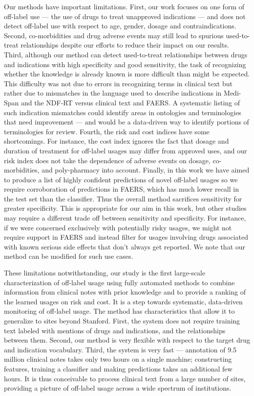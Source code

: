 Our methods have important limitations.  First, our work focuses on
one form of off-label use — the use of drugs to treat unapproved
indications — and does not detect off-label use with respect to age,
gender, dosage and contraindications.  Second, co-morbidities and drug
adverse events may still lead to spurious used-to-treat relationships
despite our efforts to reduce their impact on our results. Third,
although our method can detect used-to-treat relationships between
drugs and indications with high specificity and good sensitivity, the
task of recognizing whether the knowledge is already known is more
difficult than might be expected.  This difficulty was not due to
errors in recognizing terms in clinical text but rather due to
mismatches in the language used to describe indications in Medi-Span
and the NDF-RT versus clinical text and FAERS.  A systematic listing
of such indication mismatches could identify areas in ontologies and
terminologies that need improvement — and would be a data-driven way
to identify portions of terminologies for review.  Fourth, the risk
and cost indices have some shortcomings.  For instance, the cost index
ignores the fact that dosage and duration of treatment for off-label
usages may differ from approved uses, and our risk index does not take
the dependence of adverse events on dosage, co-morbidities, and
poly-pharmacy into account.  Finally, in this work we have aimed to
produce a list of highly confident predictions of novel off-label
usages so we require corroboration of predictions in FAERS, which has
much lower recall in the test set than the classifier.  Thus the
overall method sacrifices sensitivity for greater specificity.  This
is appropriate for our aim in this work, but other studies may require
a different trade off between sensitivity and specificity.  For
instance, if we were concerned exclusively with potentially risky
usages, we might not require support in FAERS and instead filter for
usages involving drugs associated with known serious side effects that
don’t always get reported.  We note that our method can be modified
for such use cases.

These limitations notwithstanding, our study is the first large-scale
characterization of off-label usage using fully automated methods to
combine information from clinical notes with prior knowledge and to
provide a ranking of the learned usages on risk and cost.  It is a
step towards systematic, data-driven monitoring of off-label usage.
The method has characteristics that allow it to generalize to sites
beyond Stanford.  First, the system does not require training text
labeled with mentions of drugs and indications, and the relationships
between them.  Second, our method is very flexible with respect to the
target drug and indication vocabulary.  Third, the system is very fast
— annotation of 9.5 million clinical notes takes only two hours on a
single machine; constructing features, training a classifier and
making predictions takes an additional few hours.  It is thus
conceivable to process clinical text from a large number of sites,
providing a picture of off-label usage across a wide spectrum of
institutions.


